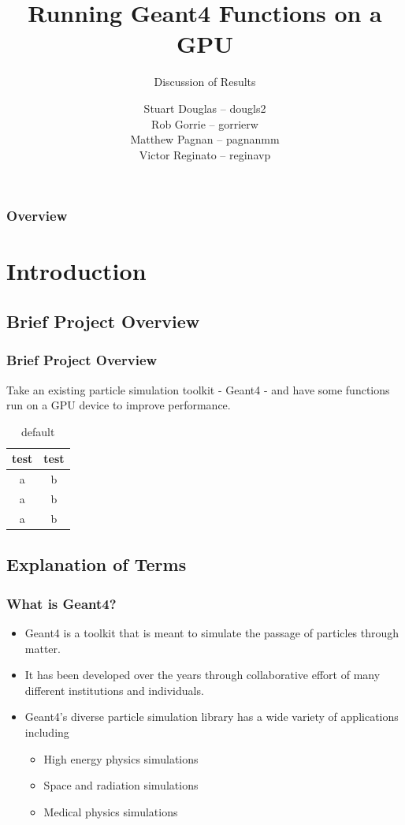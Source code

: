 \documentclass{beamer}
\title[Geant4-GPU (McMaster University)]{Running Geant4 Functions on a GPU}
\subtitle{Discussion of Results}
\institute{McMaster University}
\author[S. Douglas, R. Gorrie, M .Pagnan, V. Reginato]{
Stuart Douglas -- dougls2
\\Rob Gorrie -- gorrierw
\\Matthew Pagnan -- pagnanmm
\\Victor Reginato -- reginavp
}
\begin{document}
\frame{\titlepage}
\begin{frame}
\frametitle{Overview}
\tableofcontents
\end{frame}

\section{Introduction} 

\subsection{Brief Project Overview}
\begin{frame}
\frametitle{Brief Project Overview}
Take an existing particle simulation toolkit - Geant4 - and have some functions run on a GPU device to improve performance.
\begin{table}[htdp]
\begin{center}
\begin{tabular}{cc}
\toprule
\textbf{test} & \textbf{test}\\\midrule
a & b\\
a & b\\
a & b\\
\bottomrule
\end{tabular}
\end{center}
\caption{default}
\end{table}%

\end{frame}

\subsection{Explanation of Terms}
\begin{frame}
\frametitle{What is Geant4?}
\begin{itemize}
\item Geant4 is a toolkit that is meant to simulate the passage of particles through matter. 
\item It has been developed over the years through collaborative effort of many different institutions and individuals. 
\item Geant4's diverse particle simulation library has a wide variety of applications including
\begin{itemize}
\item High energy physics simulations
\item Space and radiation simulations
\item Medical physics simulations
\end{itemize}
\end{itemize}
\end{frame}
\end{document}
